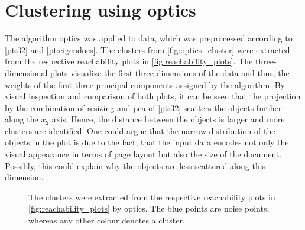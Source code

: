 \section{Clustering using \acs{optics}}\label{sec:evaluation-OPTICS}
The algorithm \ac{optics} was applied to data, which was preprocessed according to \autoref{pt:32} and \autoref{pt:eigendocs}.
The clusters from \autoref{fig:optics_cluster} were extracted from the respective reachability plots in \autoref{fig:reachability_plots}.
The three-dimensional plots visualize the first three dimensions of the data and thus, the weights of the first three principal components assigned by the \eigendocs{} algorithm.
By visual inspection and comparison of both plots, it can be seen that the projection by the combination of resizing and \ac{pca} of \autoref{pt:32} scatters the objects further along the $x_2$ axis.
Hence, the distance between the objects is larger and more clusters are identified.
One could argue that the narrow distribution of the objects in the \eigendocs{} plot is due to the fact, 
that the input data encodes not only the visual appearance in terms of page layout but also the size of the document.
Possibly, this could explain why the objects are less scattered along this dimension.

\begin{figure}%
    \centering
    \qquad
    \caption[\ac{optics} clusters]{The clusters were extracted from the respective reachability plots in \autoref{fig:reachability_plots} by \ac{optics}.
    The blue points are noise points, whereas any other colour denotes a cluster.}%
    \label{fig:optics_cluster}%
\end{figure}



